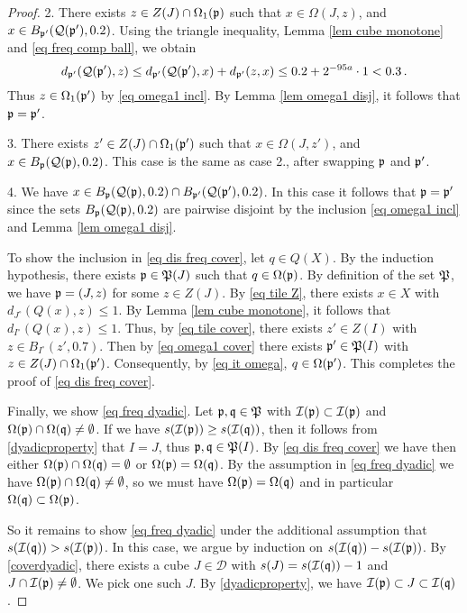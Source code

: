 \begin{proof}
    2. There exists $z \in Z(J) \cap \Omega_1(\mathfrak p)$ such that $x \in \Omega(J,z)$, and $x \in B_{\mathfrak p'}(\mathcal{Q}(\mathfrak p'), 0.2)$.  Using the triangle inequality, Lemma \ref{lem cube monotone} and \eqref{eq freq comp ball}, we obtain
    $$
        d_{\mathfrak p'}(\mathcal{Q}(\mathfrak p'),z) \le d_{\mathfrak p'}(\mathcal{Q}(\mathfrak p'), x) + d_{\mathfrak p'}(z, x) \le 0.2 + 2^{-95a} \cdot 1 < 0.3\,.
    $$
    Thus $z \in \Omega_1(\mathfrak p')$ by \eqref{eq omega1 incl}. By Lemma \ref{lem omega1 disj}, it follows that $\mathfrak p = \mathfrak p'$.

    3. There exists $z' \in Z(J) \cap \Omega_1(\mathfrak p')$ such that $x \in \Omega(J,z')$, and $x \in B_{\mathfrak p}(\mathcal{Q}(\mathfrak p), 0.2)$. This case is the same as case 2., after swapping $\mathfrak p$ and $\mathfrak p'$.

    4. We have $x \in B_{\mathfrak p}(\mathcal{Q}(\mathfrak p), 0.2) \cap B_{\mathfrak p'}(\mathcal{Q}(\mathfrak p'), 0.2)$. In this case it follows that $\mathfrak p = \mathfrak p'$ since the sets $B_{\mathfrak p}(\mathcal{Q}(\mathfrak p), 0.2)$ are pairwise disjoint by the inclusion \eqref{eq omega1 incl} and Lemma \ref{lem omega1 disj}.

    To show the inclusion in \eqref{eq dis freq cover}, let $q \in Q(X)$. By the induction hypothesis, there exists $\mathfrak p \in \mathfrak P(J)$ such that $q \in \Omega(\mathfrak p)$. By definition of the set $\mathfrak P$, we have $\mathfrak p = (J, z)$ for some $z \in Z(J)$. By \eqref{eq tile Z}, there exists $x \in X$ with $d_{J^\circ}(Q(x), z) \le 1$. By Lemma \ref{lem cube monotone}, it follows that $d_{I^\circ}(Q(x), z) \le 1$.
    Thus, by \eqref{eq tile cover}, there exists $z' \in Z(I)$ with $z \in B_{I^\circ}(z', 0.7)$. Then by \eqref{eq omega1 cover} there exists $\mathfrak p' \in \mathfrak P(I)$ with $z \in Z(J) \cap \Omega_1(\mathfrak p')$. Consequently, by \eqref{eq it omega}, $q \in \Omega(\mathfrak p')$. This completes the proof of \eqref{eq dis freq cover}.

    Finally, we show \eqref{eq freq dyadic}. Let $\mathfrak p, \mathfrak q \in \mathfrak P$ with $\mathcal{I}(\mathfrak p) \subset \mathcal{I}(\mathfrak p)$ and $\Omega(\mathfrak p) \cap \Omega(\mathfrak q) \ne \emptyset$. If we have $s(\mathcal{I}(\mathfrak p)) \ge s(\mathcal{I}(\mathfrak q))$, then it follows from \eqref{dyadicproperty} that $I = J$, thus $\mathfrak p, \mathfrak q \in \mathfrak P(I)$. By \eqref{eq dis freq cover} we have then either $\Omega(\mathfrak p) \cap \Omega(\mathfrak q) = \emptyset$ or $\Omega(\mathfrak p) = \Omega(\mathfrak q)$. By the assumption in \eqref{eq freq dyadic} we have $\Omega(\mathfrak p) \cap \Omega(\mathfrak q) \ne \emptyset$, so we must have $\Omega(\mathfrak p) = \Omega(\mathfrak q)$ and in particular $\Omega(\mathfrak q) \subset \Omega(\mathfrak p)$.

    So it remains to show \eqref{eq freq dyadic} under the additional assumption that $s(\mathcal{I}(\mathfrak q)) > s(\mathcal{I}(\mathfrak p))$. In this case, we argue by induction on $s(\mathcal{I}(\mathfrak q))-s(\mathcal{I}(\mathfrak p))$. By \eqref{coverdyadic}, there exists a cube $J \in \mathcal{D}$ with $s(J) = s(\mathcal{I}(\mathfrak q)) - 1$ and $J \cap\mathcal{I}(\mathfrak p) \ne \emptyset$. We pick one such $J$. By \eqref{dyadicproperty}, we have $\mathcal{I}(\mathfrak p) \subset J \subset \mathcal{I}(\mathfrak q)$.


\end{proof}

